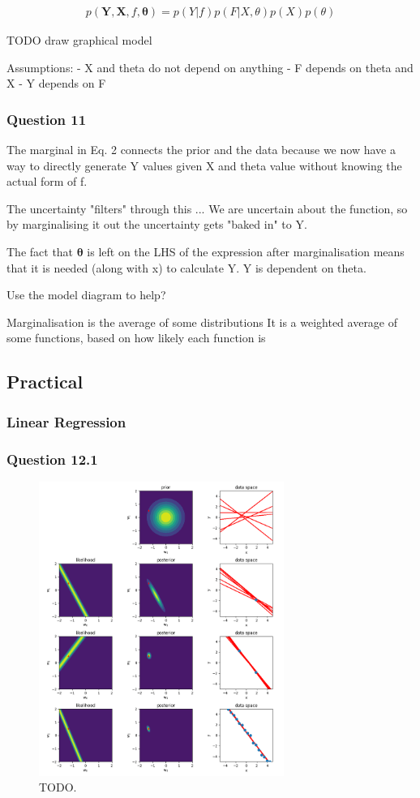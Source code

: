 \documentclass[10pt, a4paper, twocolumn]{article} %
\begin{document}
\begin{align}
  p(\mathbf{Y},\mathbf{X}, f, \mathbf{\theta}) = p(Y|f)p(F|X,\theta)p(X)p(\theta)
\end{align}

TODO draw graphical model

Assumptions:
- X and theta do not depend on anything
- F depends on theta and X
- Y depends on F

\subsubsection*{Question 11}

The marginal in Eq. 2 connects the prior and the data because we now have a way to directly generate Y values given X and theta value without knowing the actual form of f.

The uncertainty "filters" through this ...
We are uncertain about the function, so by marginalising it out the uncertainty gets "baked in" to Y.

The fact that $\mathbf{\theta}$ is left on the LHS of the expression after marginalisation means that it is needed (along with x) to calculate Y. Y is dependent on theta.

Use the model diagram to help?

Marginalisation is the average of some distributions
It is a weighted average of some functions, based on how likely each function is

\subsection{Practical}

\subsubsection{Linear Regression}

\subsubsection*{Question 12.1}

\begin{figure}[htbp]
\centerline{\includegraphics[width=8cm]{q12.png}}
\caption{TODO.}
\label{fig2}
\end{figure}
\end{document}
